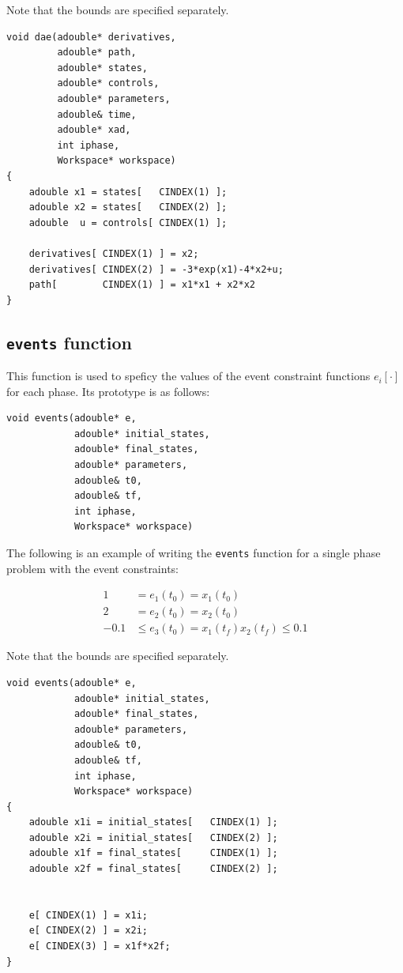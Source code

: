 \documentclass[a4paper,11pt]{report}    %
\newenvironment{shadedframe}{%
  \def\FrameCommand{\fcolorbox{black}{shadecolor}}%
  \MakeFramed {\FrameRestore}}
{\endMakeFramed}
\begin{document}
Note that the bounds are specified separately.

\begin{verbatim}
void dae(adouble* derivatives, 
         adouble* path, 
         adouble* states, 
         adouble* controls, 
         adouble* parameters, 
         adouble& time, 
         adouble* xad, 
         int iphase, 
         Workspace* workspace)
{
    adouble x1 = states[   CINDEX(1) ];
    adouble x2 = states[   CINDEX(2) ];
    adouble  u = controls[ CINDEX(1) ];

    derivatives[ CINDEX(1) ] = x2;
    derivatives[ CINDEX(2) ] = -3*exp(x1)-4*x2+u;
    path[        CINDEX(1) ] = x1*x1 + x2*x2
}
\end{verbatim}




\subsection{\texttt{events} function}

This function is used to speficy the values of the event constraint functions $e_i[\cdot]$ for each phase. Its prototype is as follows:

\begin{verbatim}
void events(adouble* e, 
            adouble* initial_states, 
            adouble* final_states, 
            adouble* parameters,
            adouble& t0, 
            adouble& tf, 
            int iphase,
            Workspace* workspace) 
\end{verbatim}


\begin{shadedframe}
 The following is an example of writing the \texttt{events} function for a single phase problem with the event
constraints:

   \begin{equation}
        \begin{aligned}
             1 &= e_1(t_0) = x_1(t_0)   \\
             2 &= e_2(t_0) = x_2(t_0)   \\
             -0.1 &\le  e_3(t_0) = x_1(t_f)x_2(t_f) \le 0.1
        \end{aligned}
   \end{equation}

Note that the bounds are specified separately.

\begin{verbatim}
void events(adouble* e, 
            adouble* initial_states, 
            adouble* final_states, 
            adouble* parameters,
            adouble& t0, 
            adouble& tf, 
            int iphase,
            Workspace* workspace)
{
    adouble x1i = initial_states[   CINDEX(1) ];
    adouble x2i = initial_states[   CINDEX(2) ];
    adouble x1f = final_states[     CINDEX(1) ];
    adouble x2f = final_states[     CINDEX(2) ];
   

    e[ CINDEX(1) ] = x1i;
    e[ CINDEX(2) ] = x2i;
    e[ CINDEX(3) ] = x1f*x2f;
}
\end{verbatim}


\end{shadedframe}
\end{document}
